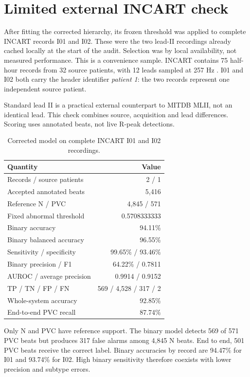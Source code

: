 \section{Limited external INCART check}\label{sec:external-incart}

After fitting the corrected hierarchy, its frozen threshold was applied to
complete INCART records I01 and I02. These were the two lead-II recordings
already cached locally at the start of the audit. Selection was by local
availability, not measured performance. This is a convenience sample.
INCART contains 75 half-hour records from 32 source patients, with 12 leads
sampled at 257 Hz \cite{incartdb}. I01 and I02 both carry the header identifier
\emph{patient 1}: the two records represent one independent source patient.

Standard lead II is a practical external counterpart to MITDB MLII, not an
identical lead. This check combines source, acquisition and lead differences.
Scoring uses annotated beats, not live R-peak detections.

\begin{table}[H]
\centering
\caption{Corrected model on complete INCART I01 and I02 recordings.}
\label{tab:external-incart-summary}
\begin{tabular}{lr}
\toprule
Quantity & Value\\
\midrule
Records / source patients & 2 / 1\\
Accepted annotated beats & 5,416\\
Reference N / PVC & 4,845 / 571\\
Fixed abnormal threshold & 0.5708333333\\
Binary accuracy & 94.11\%\\
Binary balanced accuracy & 96.55\%\\
Sensitivity / specificity & 99.65\% / 93.46\%\\
Binary precision / F1 & 64.22\% / 0.7811\\
AUROC / average precision & 0.9914 / 0.9152\\
TP / TN / FP / FN & 569 / 4,528 / 317 / 2\\
Whole-system accuracy & 92.85\%\\
End-to-end PVC recall & 87.74\%\\
\bottomrule
\end{tabular}
\end{table}

Only N and PVC have reference support. The binary model detects 569 of 571
PVC beats but produces 317 false alarms among 4,845 N beats. End to end,
501 PVC beats receive the correct label. Binary accuracies by record are
94.47\% for I01 and 93.74\% for I02. High binary sensitivity therefore
coexists with lower precision and subtype errors.

